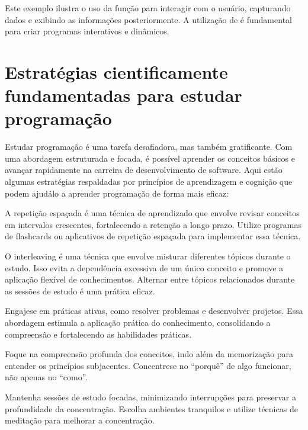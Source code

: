 \documentclass[letterpaper,10pt,english]{jupyterBook}
\begin{document}
\sphinxAtStartPar
Este exemplo ilustra o uso da função  para interagir com o usuário, capturando dados e exibindo as informações posteriormente. A utilização de  é fundamental para criar programas interativos e dinâmicos.


\section{Estratégias cientificamente fundamentadas para estudar programação}
\label{\detokenize{chapters/ch1/ch1:estrategias-cientificamente-fundamentadas-para-estudar-programacao}}
\sphinxAtStartPar
Estudar programação é uma tarefa desafiadora, mas também gratificante. Com uma abordagem estruturada e focada, é possível aprender os conceitos básicos e avançar rapidamente na carreira de desenvolvimento de software. Aqui estão algumas estratégias respaldadas por princípios de aprendizagem e cognição que podem ajudá\sphinxhyphen{}lo a aprender programação de forma mais eficaz:

\sphinxAtStartPar
{}
A repetição espaçada é uma técnica de aprendizado que envolve revisar conceitos em intervalos crescentes, fortalecendo a retenção a longo prazo. Utilize programas de flashcards ou aplicativos de repetição espaçada para implementar essa técnica.

\sphinxAtStartPar
{}
O interleaving é uma técnica que envolve misturar diferentes tópicos durante o estudo. Isso evita a dependência excessiva de um único conceito e promove a aplicação flexível de conhecimentos. Alternar entre tópicos relacionados durante as sessões de estudo é uma prática eficaz.

\sphinxAtStartPar
{}
Engaje\sphinxhyphen{}se em práticas ativas, como resolver problemas e desenvolver projetos. Essa abordagem estimula a aplicação prática do conhecimento, consolidando a compreensão e fortalecendo as habilidades práticas.

\sphinxAtStartPar
{}
Foque na compreensão profunda dos conceitos, indo além da memorização para entender os princípios subjacentes. Concentre\sphinxhyphen{}se no “porquê” de algo funcionar, não apenas no “como”.

\sphinxAtStartPar
{}
Mantenha sessões de estudo focadas, minimizando interrupções para preservar a profundidade da concentração. Escolha ambientes tranquilos e utilize técnicas de meditação para melhorar a concentração.
\end{document}
